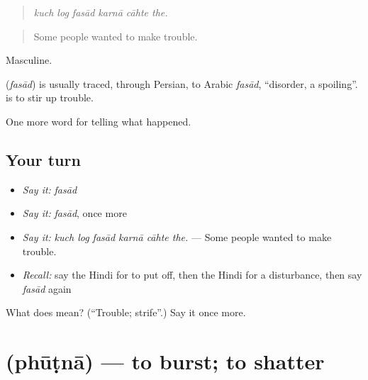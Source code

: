 \begin{quote}
     
\end{quote}

\begin{quote}
\emph{kuch log fasād karnā cāhte the.}
\end{quote}

\begin{quote}
Some people wanted to make trouble.
\end{quote}

Masculine.

\begin{cousinweb}
\textbf{} (\emph{fasād}) is usually traced, through Persian, to Arabic \emph{fasād}, \textquotedblleft{}disorder, a spoiling\textquotedblright{}. \textbf{ } is to stir up trouble.
\end{cousinweb}

\begin{grammarlens}[title={What you've built}]
One more word for telling what happened.
\end{grammarlens}

\subsection*{Your turn}
\begin{itemize}
\raggedright
  \item \emph{Say it:} \emph{fasād}
  \item \emph{Say it:} \emph{fasād}, once more
  \item \emph{Say it:} \emph{kuch log fasād karnā cāhte the.} — Some people wanted to make trouble.
  \item \emph{Recall:} say the Hindi for to put off, then the Hindi for a disturbance, then say \emph{fasād} again
\end{itemize}

\begin{tcolorbox}[breakable,colback=teal!4,colframe=teal!35!black,title={Before you move on}]
What does  mean? (\textquotedblleft{}Trouble; strife\textquotedblright{}.) Say it once more.
\end{tcolorbox}
\section[\texorpdfstring{\hi{फूटना} (phūṭnā)}{फूटना (phūṭnā)}]{ (phūṭnā) — to burst; to shatter}

